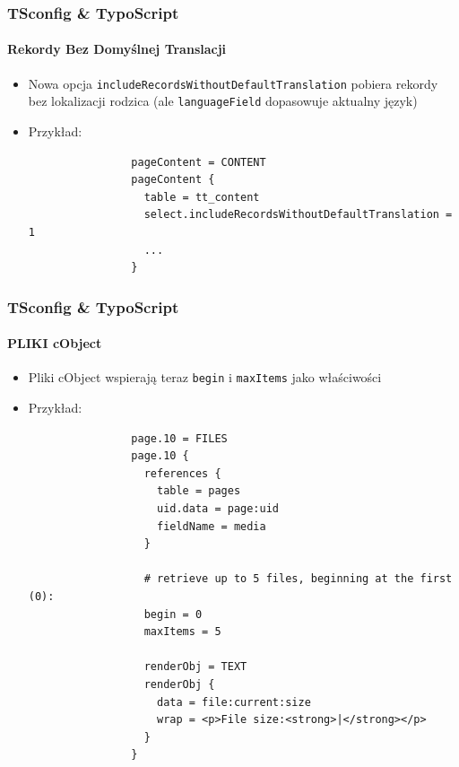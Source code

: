 
\begin{frame}[fragile]
	\frametitle{TSconfig \& TypoScript}
	\framesubtitle{Rekordy Bez Domyślnej Translacji}

	\begin{itemize}

		\item Nowa opcja \texttt{includeRecordsWithoutDefaultTranslation}
			pobiera rekordy bez lokalizacji rodzica\newline
			(ale \texttt{languageField} dopasowuje aktualny język)

		\item Przykład:

			\begin{lstlisting}
				pageContent = CONTENT
				pageContent {
				  table = tt_content
				  select.includeRecordsWithoutDefaultTranslation = 1
				  ...
				}
			\end{lstlisting}

	\end{itemize}

\end{frame}


\begin{frame}[fragile]
	\frametitle{TSconfig \& TypoScript}
	\framesubtitle{PLIKI cObject}

	\begin{itemize}

		\item Pliki cObject wspierają teraz \texttt{begin} i \texttt{maxItems} jako właściwości

		\item Przykład:

			\lstset{
				basicstyle=\tiny\ttfamily
			}

			\begin{lstlisting}
				page.10 = FILES
				page.10 {
				  references {
				    table = pages
				    uid.data = page:uid
				    fieldName = media
				  }

				  # retrieve up to 5 files, beginning at the first (0):
				  begin = 0
				  maxItems = 5

				  renderObj = TEXT
				  renderObj {
				    data = file:current:size
				    wrap = <p>File size:<strong>|</strong></p>
				  }
				}
			\end{lstlisting}

	\end{itemize}

\end{frame}

